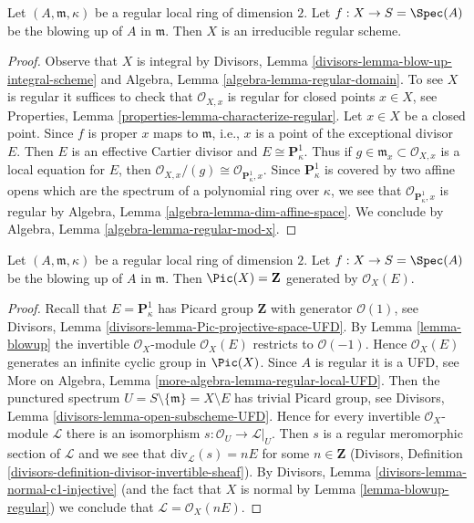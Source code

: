 \begin{lemma}
\label{lemma-blowup-regular}
Let $(A, \mathfrak m, \kappa)$ be a regular local ring of dimension $2$.
Let $f : X \to S = \Spec(A)$ be the blowing up of $A$ in $\mathfrak m$.
Then $X$ is an irreducible regular scheme.
\end{lemma}

\begin{proof}
Observe that $X$ is integral by
Divisors, Lemma \ref{divisors-lemma-blow-up-integral-scheme}
and
Algebra, Lemma \ref{algebra-lemma-regular-domain}.
To see $X$ is regular it suffices to check that $\mathcal{O}_{X, x}$
is regular for closed points $x \in X$, see
Properties, Lemma \ref{properties-lemma-characterize-regular}.
Let $x \in X$ be a closed point. Since $f$ is proper $x$ maps to
$\mathfrak m$, i.e., $x$ is a point of the exceptional divisor $E$.
Then $E$ is an effective Cartier divisor and $E \cong \mathbf{P}^1_\kappa$.
Thus if $g \in \mathfrak m_x \subset \mathcal{O}_{X, x}$ is a local
equation for $E$, then
$\mathcal{O}_{X, x}/(g) \cong \mathcal{O}_{\mathbf{P}^1_\kappa, x}$.
Since $\mathbf{P}^1_\kappa$ is covered by two affine opens which are the
spectrum of a polynomial ring over $\kappa$, we see that
$\mathcal{O}_{\mathbf{P}^1_\kappa, x}$ is regular by
Algebra, Lemma \ref{algebra-lemma-dim-affine-space}.
We conclude by
Algebra, Lemma \ref{algebra-lemma-regular-mod-x}.
\end{proof}

\begin{lemma}
\label{lemma-blowup-pic}
Let $(A, \mathfrak m, \kappa)$ be a regular local ring of dimension $2$.
Let $f : X \to S = \Spec(A)$ be the blowing up of $A$ in $\mathfrak m$.
Then $\Pic(X) = \mathbf{Z}$ generated by $\mathcal{O}_X(E)$.
\end{lemma}

\begin{proof}
Recall that $E = \mathbf{P}^1_\kappa$ has Picard group $\mathbf{Z}$
with generator $\mathcal{O}(1)$, see
Divisors, Lemma \ref{divisors-lemma-Pic-projective-space-UFD}.
By Lemma \ref{lemma-blowup} the invertible $\mathcal{O}_X$-module
$\mathcal{O}_X(E)$ restricts to $\mathcal{O}(-1)$. Hence
$\mathcal{O}_X(E)$ generates an infinite cyclic group in $\Pic(X)$.
Since $A$ is regular it is a UFD, see More on Algebra, 
Lemma \ref{more-algebra-lemma-regular-local-UFD}.
Then the punctured spectrum $U = S \setminus \{\mathfrak m\} = X \setminus E$
has trivial Picard group, see
Divisors, Lemma \ref{divisors-lemma-open-subscheme-UFD}.
Hence for every invertible $\mathcal{O}_X$-module $\mathcal{L}$
there is an isomorphism $s : \mathcal{O}_U \to \mathcal{L}|_U$.
Then $s$ is a regular meromorphic section of $\mathcal{L}$
and we see that $\text{div}_\mathcal{L}(s) = nE$ for some
$n \in \mathbf{Z}$
(Divisors, Definition \ref{divisors-definition-divisor-invertible-sheaf}).
By Divisors, Lemma \ref{divisors-lemma-normal-c1-injective}
(and the fact that $X$ is normal by Lemma \ref{lemma-blowup-regular})
we conclude that $\mathcal{L} = \mathcal{O}_X(nE)$.
\end{proof}

